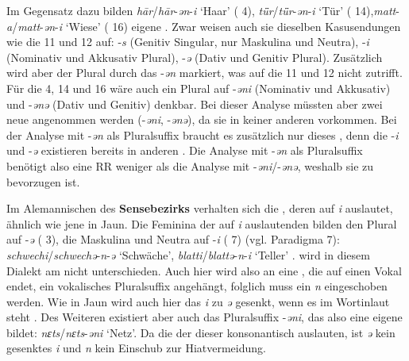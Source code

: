 Im Gegensatz dazu bilden \textit{h\=ar}/\textit{h\=ar}-\textit{ən}-\textit{i} ‘Haar’ ( 4), \textit{tǖr}/\textit{tǖr}-\textit{ən}-\textit{i} ‘Tür’ ( 14),\largerpage[2]  \textit{matt}-\textit{a}/\textit{matt}-\textit{ən}-\textit{i} ‘Wiese’ ( 16) eigene . Zwar weisen auch sie dieselben Kasusendungen wie die  11 und 12 auf: -\textit{s} (Genitiv Singular, nur Maskulina und Neutra), -\textit{i} (Nominativ und Akkusativ Plural), -\textit{ə} (Dativ und Genitiv Plural). Zusätzlich wird aber der Plural durch das  -\textit{ən} markiert, was auf die  11 und 12 nicht zutrifft. Für die  4, 14 und 16 wäre auch ein Plural auf -\textit{əni} (Nominativ und Akkusativ) und -\textit{ənə} (Dativ und Genitiv) denkbar. Bei dieser Analyse müssten aber zwei neue  angenommen werden (-\textit{əni}, -\textit{ənə}), da sie in keiner anderen  vorkommen. Bei der Analyse mit -\textit{ən} als Pluralsuffix braucht es zusätzlich nur dieses , denn die  -\textit{i} und -\textit{ə} existieren bereits in anderen . Die Analyse mit -\textit{ən} als Pluralsuffix benötigt also eine RR weniger als die Analyse mit -\textit{əni}/-\textit{ənə}, weshalb sie zu bevorzugen ist.

Im Alemannischen des \textbf{Sensebezirks} verhalten sich die , deren\linebreak {} auf \textit{i} auslautet, ähnlich wie jene in Jaun. Die Feminina der auf \textit{i} auslautenden  bilden den Plural auf -\textit{ə} ( 3), die Maskulina und Neutra auf -\textit{i} ( 7) (vgl. Paradigma 7): \textit{schwechi}/\textit{schwechə}-\textit{n}-\textit{ə} ‘Schwäche’, \textit{blatti}/\textit{blattə}-\textit{n}-\textit{i} ‘Teller’ \citet[188, 186]{Henzen1927}.  wird in diesem Dialekt am  nicht unterschieden. Auch hier wird also an eine , die auf einen Vokal endet, ein vokalisches Pluralsuffix angehängt, folglich muss ein \textit{n} eingeschoben werden. Wie in Jaun wird auch hier das \textit{i} zu \textit{ə} gesenkt, wenn es im Wortinlaut steht \citep[124]{Henzen1927}. Des Weiteren existiert aber auch das Pluralsuffix -\textit{əni}, das also eine eigene  bildet: \textit{nɛts}/\textit{nɛts}-\textit{əni} ‘Netz’. Da die  der  dieser  konsonantisch auslauten, ist \textit{ə} kein gesenktes \textit{i} und \textit{n} kein Einschub zur Hiatvermeidung.

